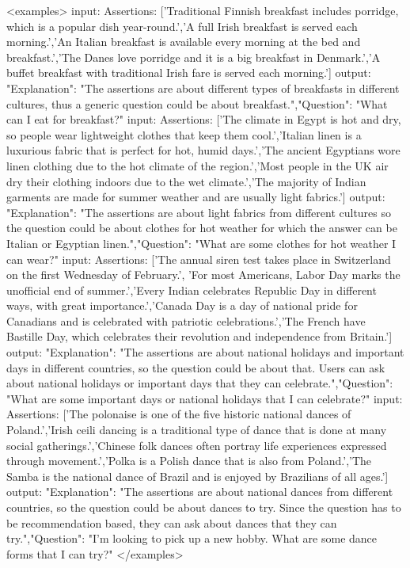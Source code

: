 <examples>
input:
    Assertions: ['Traditional Finnish breakfast includes porridge, which is a popular dish year-round.','A full Irish breakfast is served each morning.','An Italian breakfast is available every morning at the bed and breakfast.','The Danes love porridge and it is a big breakfast in Denmark.','A buffet breakfast with traditional Irish fare is served each morning.']
output:
{"Explanation": "The assertions are about different types of breakfasts in different cultures, thus a generic question could be about breakfast.","Question": "What can I eat for breakfast?"}
input:
    Assertions: ['The climate in Egypt is hot and dry, so people wear lightweight clothes that keep them cool.','Italian linen is a luxurious fabric that is perfect for hot, humid days.','The ancient Egyptians wore linen clothing due to the hot climate of the region.','Most people in the UK air dry their clothing indoors due to the wet climate.','The majority of Indian garments are made for summer weather and are usually light fabrics.']
output:
{"Explanation": "The assertions are about light fabrics from different cultures so the question could be about clothes for hot weather for which the answer can be Italian or Egyptian linen.","Question": "What are some clothes for hot weather I can wear?"}
input:
    Assertions: ['The annual siren test takes place in Switzerland on the first Wednesday of February.', 'For most Americans, Labor Day marks the unofficial end of summer.','Every Indian celebrates Republic Day in different ways, with great importance.','Canada Day is a day of national pride for Canadians and is celebrated with patriotic celebrations.','The French have Bastille Day, which celebrates their revolution and independence from Britain.']
output:
{"Explanation": "The assertions are about national holidays and important days in different countries, so the question could be about that. Users can ask about national holidays or important days that they can celebrate.","Question": "What are some important days or national holidays that I can celebrate?"}
input:
    Assertions: ['The polonaise is one of the five historic national dances of Poland.','Irish ceili dancing is a traditional type of dance that is done at many social gatherings.','Chinese folk dances often portray life experiences expressed through movement.','Polka is a Polish dance that is also from Poland.','The Samba is the national dance of Brazil and is enjoyed by Brazilians of all ages.']
output:
{"Explanation": "The assertions are about national dances from different countries, so the question could be about dances to try. Since the question has to be recommendation based, they can ask about dances that they can try.","Question": "I'm looking to pick up a new hobby. What are some dance forms that I can try?"}
</examples>

